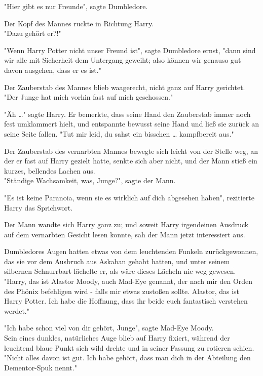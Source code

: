 {"Hier gibt es nur Freunde", sagte Dumbledore.

Der Kopf des Mannes ruckte in Richtung Harry.\\ "Dazu gehört er?!"

"Wenn Harry Potter nicht unser Freund ist", sagte Dumbledore ernst, "dann sind wir alle mit Sicherheit dem Untergang geweiht; also können wir genauso gut davon ausgehen, dass er es ist."

Der Zauberstab des Mannes blieb waagerecht, nicht ganz auf Harry gerichtet.\\ "Der Junge hat mich vorhin fast auf mich geschossen."

"Äh …" sagte Harry. Er bemerkte, dass seine Hand den Zauberstab immer noch fest umklammert hielt, und entspannte bewusst seine Hand und ließ sie zurück an seine Seite fallen. "Tut mir leid, du sahst ein bisschen … kampfbereit aus."

Der Zauberstab des vernarbten Mannes bewegte sich leicht von der Stelle weg, an der er fast auf Harry gezielt hatte, senkte sich aber nicht, und der Mann stieß ein kurzes, bellendes Lachen aus.\\ "Ständige Wachsamkeit, was, Junge?", sagte der Mann.

"Es ist keine Paranoia, wenn sie es wirklich auf dich abgesehen haben", rezitierte Harry das Sprichwort.

Der Mann wandte sich Harry ganz zu; und soweit Harry irgendeinen Ausdruck auf dem vernarbten Gesicht lesen konnte, sah der Mann jetzt interessiert aus.

Dumbledores Augen hatten etwas von dem leuchtenden Funkeln zurückgewonnen, das sie vor dem Ausbruch aus Askaban gehabt hatten, und unter seinem silbernen Schnurrbart lächelte er, als wäre dieses Lächeln nie weg gewesen.\\ "Harry, das ist Alastor Moody, auch Mad-Eye genannt, der nach mir den Orden des Phönix befehligen wird - falls mir etwas zustoßen sollte. Alastor, das ist Harry Potter. Ich habe die Hoffnung, dass ihr beide euch fantastisch verstehen werdet."

"Ich habe schon viel von dir gehört, Junge", sagte Mad-Eye Moody.\\ Sein eines dunkles, natürliches Auge blieb auf Harry fixiert, während der leuchtend blaue Punkt sich wild drehte und in seiner Fassung zu rotieren schien.\\ "Nicht alles davon ist gut. Ich habe gehört, dass man dich in der Abteilung den Dementor-Spuk nennt."

}
